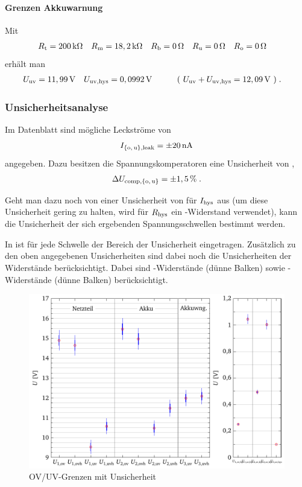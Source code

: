 \paragraph{Grenzen Akkuwarnung}

Mit
\begin{align*}
	R_{\mathrm{t}} & = 200\,\mathrm{k\Omega} &
	R_{\mathrm{m}} & = 18,2\,\mathrm{k\Omega} &
	R_{\mathrm{b}} & = 0\,\mathrm{\Omega} &
	R_{\mathrm{u}} & = 0\,\mathrm{\Omega} &
	R_{\mathrm{o}} & = 0\,\mathrm{\Omega}
\end{align*}
erhält man
\begin{align*}
	U_{\mathrm{uv}} & = 11,99\,\mathrm{V} &
	U_{\mathrm{uv,hys}} & = 0,0992\,\mathrm{V} &
	\qquad ( \ U_{\mathrm{uv}} + U_{\mathrm{uv,hys}} & = 12,09\,\mathrm{V} \ )\;.
\end{align*}



\subsubsection{Unsicherheitsanalyse}

Im Datenblatt sind mögliche Leckströme von
\begin{align*}
	I_{\mathrm{\{o,\,u\},leak}} = \pm 20\,\mathrm{nA}
\end{align*}
angegeben. Dazu besitzen die Spannungskomperatoren eine Unsicherheit von ,
\begin{align*}
	\Delta U_{\mathrm{comp,\{o,\,u\}}} = \pm 1,5\,\mathrm{\%}\;.
\end{align*}

Geht man dazu noch von einer Unsicherheit von  für $I_{\mathrm{hys}}$ aus (um diese Unsicherheit gering zu halten, wird für $R_{\mathrm{hys}}$ ein -Widerstand verwendet), kann die Unsicherheit der sich ergebenden Spannungsschwellen bestimmt werden.

In  ist für jede Schwelle der Bereich der Unsicherheit eingetragen. Zusätzlich zu den oben angegebenen Unsicherheiten sind dabei noch die Unsicherheiten der Widerstände berücksichtigt. Dabei sind -Widerstände (dünne Balken) sowie -Widerstände (dünne Balken) berücksichtigt.

\begin{figure}[htb]%
	\centering
	\includegraphics{tikz/ext/OVUVLimits-ext}%
	\caption{OV/UV-Grenzen mit Unsicherheit}%
	\label{fig:OVUVLimits}%
\end{figure}

